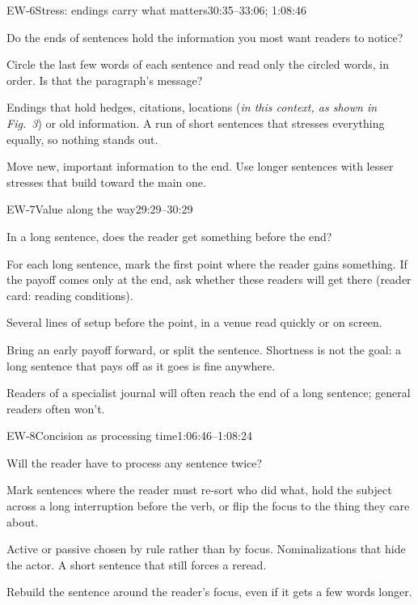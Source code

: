 \documentclass[11pt]{article}
\begin{document}
\begin{criterion}{EW-6}{Stress: endings carry what matters}{30:35--33:06; 1:08:46}
\begin{fields}
  \item[Ask] Do the ends of sentences hold the information you most want readers to notice?
  \item[Check] Circle the last few words of each sentence and read only the circled words, in order. Is that the
    paragraph's message?
  \item[Red flags] Endings that hold hedges, citations, locations (\emph{in this context, as shown in Fig.~3})
    or old information. A run of short sentences that stresses everything equally, so nothing stands out.
  \item[Fix] Move new, important information to the end. Use longer sentences with lesser stresses that build
    toward the main one.
\end{fields}
\end{criterion}

\begin{criterion}{EW-7}{Value along the way}{29:29--30:29}
\begin{fields}
  \item[Ask] In a long sentence, does the reader get something before the end?
  \item[Check] For each long sentence, mark the first point where the reader gains something. If the payoff
    comes only at the end, ask whether these readers will get there (reader card: reading conditions).
  \item[Red flags] Several lines of setup before the point, in a venue read quickly or on screen.
  \item[Fix] Bring an early payoff forward, or split the sentence. Shortness is not the goal: a long sentence
    that pays off as it goes is fine anywhere.
  \item[Note] Readers of a specialist journal will often reach the end of a long sentence; general readers
    often won't.
\end{fields}
\end{criterion}

\begin{criterion}{EW-8}{Concision as processing time}{1:06:46--1:08:24}
\begin{fields}
  \item[Ask] Will the reader have to process any sentence twice?
  \item[Check] Mark sentences where the reader must re-sort who did what, hold the subject across a long
    interruption before the verb, or flip the focus to the thing they care about.
  \item[Red flags] Active or passive chosen by rule rather than by focus. Nominalizations that hide the actor.
    A short sentence that still forces a reread.
  \item[Fix] Rebuild the sentence around the reader's focus, even if it gets a few words longer.
\end{fields}
\end{criterion}
\end{document}
